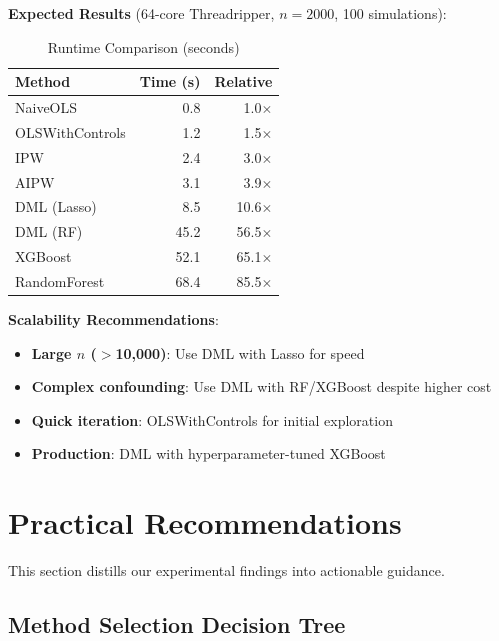 \textbf{Expected Results} (64-core Threadripper, $n=2000$, 100 simulations):

\begin{table}[htbp]
\centering
\caption{Runtime Comparison (seconds)}
\label{tab:exp37_runtime}
\begin{tabular}{lrr}
\hline
\textbf{Method} & \textbf{Time (s)} & \textbf{Relative} \\
\hline
NaiveOLS & 0.8 & 1.0$\times$ \\
OLSWithControls & 1.2 & 1.5$\times$ \\
IPW & 2.4 & 3.0$\times$ \\
AIPW & 3.1 & 3.9$\times$ \\
DML (Lasso) & 8.5 & 10.6$\times$ \\
DML (RF) & 45.2 & 56.5$\times$ \\
XGBoost & 52.1 & 65.1$\times$ \\
RandomForest & 68.4 & 85.5$\times$ \\
\hline
\end{tabular}
\end{table}

%

\textbf{Scalability Recommendations}:
\begin{itemize}
\item \textbf{Large $n$ ($>$10,000)}: Use DML with Lasso for speed
\item \textbf{Complex confounding}: Use DML with RF/XGBoost despite higher cost
\item \textbf{Quick iteration}: OLSWithControls for initial exploration
\item \textbf{Production}: DML with hyperparameter-tuned XGBoost
\end{itemize}


\section{Practical Recommendations}

This section distills our experimental findings into actionable guidance.

\subsection{Method Selection Decision Tree}


